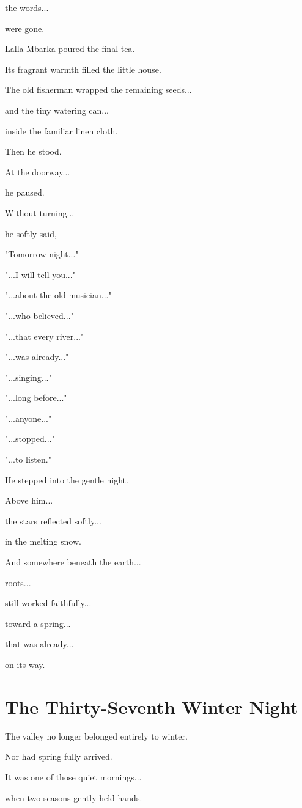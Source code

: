 \documentclass[12pt,openany]{book}
\begin{document}
the words...

were gone.

Lalla Mbarka poured the final tea.

Its fragrant warmth filled the little house.

The old fisherman wrapped the remaining seeds...

and the tiny watering can...

inside the familiar linen cloth.

Then he stood.

At the doorway...

he paused.

Without turning...

he softly said,

"Tomorrow night..."

"...I will tell you..."

"...about the old musician..."

"...who believed..."

"...that every river..."

"...was already..."

"...singing..."

"...long before..."

"...anyone..."

"...stopped..."

"...to listen."

He stepped into the gentle night.

Above him...

the stars reflected softly...

in the melting snow.

And somewhere beneath the earth...

roots...

still worked faithfully...

toward a spring...

that was already...

on its way.
\chapter{The Thirty-Seventh Winter Night}

The valley no longer belonged entirely to winter.

Nor had spring fully arrived.

It was one of those quiet mornings...

when two seasons gently held hands.
\end{document}
